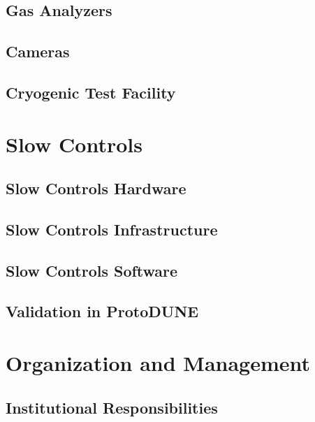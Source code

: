 \subsection{Gas Analyzers}

\subsection{Cameras}

\subsection{Cryogenic Test Facility}


\section{Slow Controls}

\subsection{Slow Controls Hardware}

\subsection{Slow Controls Infrastructure}

\subsection{Slow Controls Software}

\subsection{Validation in ProtoDUNE}


\section{Organization and Management}

\subsection{Institutional Responsibilities}

